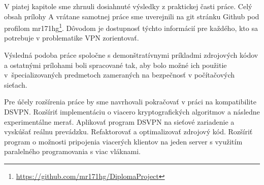 V piatej kapitole sme zhrnuli dosiahnuté výsledky z praktickej časti práce. Celý obsah prílohy A vrátane samotnej práce sme uverejnili na git stránku Github pod profilom mr171hg\footnote{\url{https://github.com/mr171hg/DiplomaProject}}. Dôvodom je dostupnosť týchto informácií pre každého, kto sa potrebuje v problematike VPN zorientovať.  

Výsledná podoba práce spoločne s demonštratívnymi príkladmi zdrojových kódov a ostatnými prílohami boli spracované tak, aby bolo možné ich použitie v~špecializovaných predmetoch zameraných na bezpečnosť v počítačových sieťach.

Pre účely rozšírenia práce by sme navrhovali pokračovať v práci na kompatibilite DSVPN. Rozšíriť implementáciu o viacero kryptografických algoritmov a následne experimentálne merať. Aplikovať program DSVPN na sieťové zariadenie a vyskúšať reálnu prevádzku. Refaktorovať a optimalizovať zdrojový kód. Rozšíriť program o možnosti pripojenia viacerých klientov na jeden server s využitím paralelného programovania s viac vláknami. 
